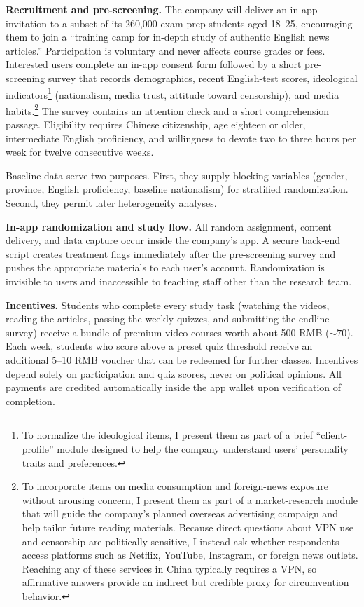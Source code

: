 \documentclass[12pt, american]{article}
\begin{document}
\textbf{Recruitment and pre-screening.}
The company will deliver an in-app invitation to a subset of its 260,000 exam-prep students aged 18–25, encouraging them to join a “training camp for in-depth study of authentic English news articles.”
Participation is voluntary and never affects course grades or fees.  Interested users complete an in-app consent form followed by a short pre-screening survey that records demographics, recent English-test scores, ideological indicators\footnote{To normalize the ideological items, I present them as part of a brief “client-profile” module designed to help the company understand users’ personality traits and preferences.} (nationalism, media trust, attitude toward censorship), and media habits.\footnote{To incorporate items on media consumption and foreign-news exposure without arousing concern, I present them as part of a market-research module that will guide the company’s planned overseas advertising campaign and help tailor future reading materials. Because direct questions about VPN use and censorship are politically sensitive, I instead ask whether respondents access platforms such as Netflix, YouTube, Instagram, or foreign news outlets. Reaching any of these services in China typically requires a VPN, so affirmative answers provide an indirect but credible proxy for circumvention behavior.}    The survey contains an attention check and a short comprehension passage.  Eligibility requires Chinese citizenship, age eighteen or older, intermediate English proficiency, and willingness to devote two to three hours per week for twelve consecutive weeks.

Baseline data serve two purposes.  First, they supply blocking variables (gender, province, English proficiency, baseline nationalism) for stratified randomization.  Second, they permit later heterogeneity analyses.

\textbf{In-app randomization and study flow.}
All random assignment, content delivery, and data capture occur inside the company’s app.  A secure back-end script creates treatment flags immediately after the pre-screening survey and pushes the appropriate materials to each user’s account.  Randomization is invisible to users and inaccessible to teaching staff other than the research team.

\textbf{Incentives.}
Students who complete every study task (watching the videos, reading the articles, passing the weekly quizzes, and submitting the endline survey) receive a bundle of premium video courses worth about 500 RMB ($\sim 70$).  Each week, students who score above a preset quiz threshold receive an additional 5–10 RMB voucher that can be redeemed for further classes.  Incentives depend solely on participation and quiz scores, never on political opinions.  All payments are credited automatically inside the app wallet upon verification of completion.
\end{document}
